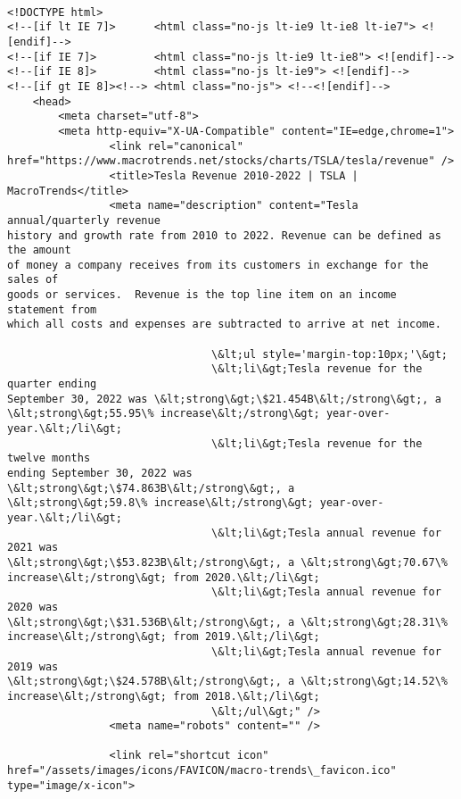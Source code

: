 \documentclass[11pt]{article}
\begin{document}
    \begin{Verbatim}[commandchars=\\\{\}]

<!DOCTYPE html>
<!--[if lt IE 7]>      <html class="no-js lt-ie9 lt-ie8 lt-ie7"> <![endif]-->
<!--[if IE 7]>         <html class="no-js lt-ie9 lt-ie8"> <![endif]-->
<!--[if IE 8]>         <html class="no-js lt-ie9"> <![endif]-->
<!--[if gt IE 8]><!--> <html class="no-js"> <!--<![endif]-->
    <head>
        <meta charset="utf-8">
        <meta http-equiv="X-UA-Compatible" content="IE=edge,chrome=1">
                <link rel="canonical"
href="https://www.macrotrends.net/stocks/charts/TSLA/tesla/revenue" />
                <title>Tesla Revenue 2010-2022 | TSLA | MacroTrends</title>
                <meta name="description" content="Tesla annual/quarterly revenue
history and growth rate from 2010 to 2022. Revenue can be defined as the amount
of money a company receives from its customers in exchange for the sales of
goods or services.  Revenue is the top line item on an income statement from
which all costs and expenses are subtracted to arrive at net income.

                                \&lt;ul style='margin-top:10px;'\&gt;
                                \&lt;li\&gt;Tesla revenue for the quarter ending
September 30, 2022 was \&lt;strong\&gt;\$21.454B\&lt;/strong\&gt;, a
\&lt;strong\&gt;55.95\% increase\&lt;/strong\&gt; year-over-year.\&lt;/li\&gt;
                                \&lt;li\&gt;Tesla revenue for the twelve months
ending September 30, 2022 was \&lt;strong\&gt;\$74.863B\&lt;/strong\&gt;, a
\&lt;strong\&gt;59.8\% increase\&lt;/strong\&gt; year-over-year.\&lt;/li\&gt;
                                \&lt;li\&gt;Tesla annual revenue for 2021 was
\&lt;strong\&gt;\$53.823B\&lt;/strong\&gt;, a \&lt;strong\&gt;70.67\%
increase\&lt;/strong\&gt; from 2020.\&lt;/li\&gt;
                                \&lt;li\&gt;Tesla annual revenue for 2020 was
\&lt;strong\&gt;\$31.536B\&lt;/strong\&gt;, a \&lt;strong\&gt;28.31\%
increase\&lt;/strong\&gt; from 2019.\&lt;/li\&gt;
                                \&lt;li\&gt;Tesla annual revenue for 2019 was
\&lt;strong\&gt;\$24.578B\&lt;/strong\&gt;, a \&lt;strong\&gt;14.52\%
increase\&lt;/strong\&gt; from 2018.\&lt;/li\&gt;
                                \&lt;/ul\&gt;" />
                <meta name="robots" content="" />

                <link rel="shortcut icon"
href="/assets/images/icons/FAVICON/macro-trends\_favicon.ico"
type="image/x-icon">


\end{Verbatim}
\end{document}
